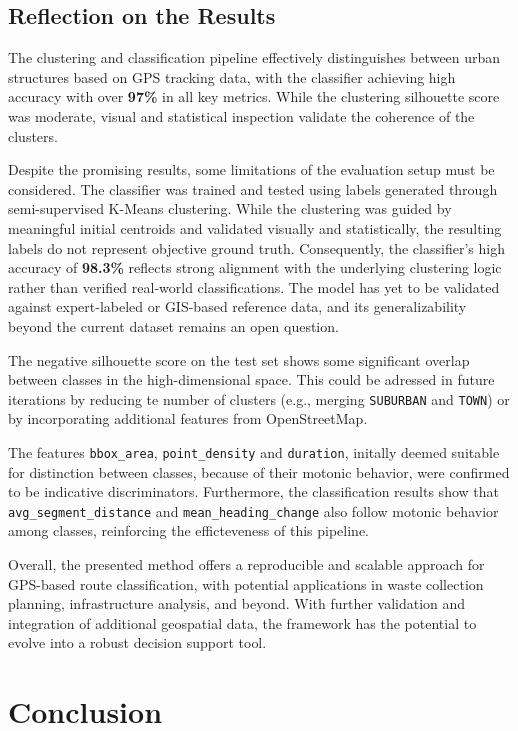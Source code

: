 \documentclass[a4paper,12pt,twoside]{scrreprt}
\begin{document}
\section{Reflection on the Results}

The clustering and classification pipeline effectively distinguishes between
urban structures based on GPS tracking data, with the classifier achieving high
accuracy with over \textbf{97\%} in all
key metrics. While the clustering silhouette score was moderate, visual and
statistical inspection validate the coherence of the clusters.

Despite the promising results, some limitations of the evaluation setup must be
considered. The classifier was trained and tested using labels generated
through semi-supervised K-Means clustering. While the clustering was guided by
meaningful initial centroids and validated visually and statistically, the
resulting labels do not represent objective ground truth. Consequently, the
classifier's high accuracy of \textbf{98.3\%} reflects strong alignment with
the underlying clustering logic rather than verified real-world
classifications. The model has yet to be validated against expert-labeled or
GIS-based reference data, and its generalizability beyond the current dataset
remains an open question.

The negative silhouette score on the test set shows some significant
overlap between classes in the high-dimensional space. This could
be adressed in future iterations by reducing te number of clusters (e.g.,
merging \texttt{SUBURBAN} and \texttt{TOWN}) or by incorporating additional
features from OpenStreetMap.

The features \texttt{bbox\_area}, \texttt{point\_density} and
\texttt{duration},
initally deemed suitable for distinction between classes, because of their
motonic
behavior, were confirmed to be indicative discriminators.
Furthermore, the
classification results show that \texttt{avg\_segment\_distance} and
\texttt{mean\_heading\_change} also follow motonic behavior among classes,
reinforcing the efficteveness of this pipeline.

Overall, the presented method offers a reproducible and scalable approach for
GPS-based
route classification, with potential applications in waste collection
planning, infrastructure analysis, and beyond. With further validation and
integration of additional geospatial data, the framework has the potential to
evolve into a robust decision support tool.

\chapter{Conclusion}
\end{document}
